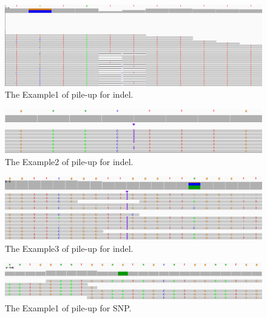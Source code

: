 \documentclass[PhD]{PHlab-thesis}
\begin{document}
\begin{figure}[h!]
	\centering
	\includegraphics[scale=0.3]{figures/INDEL1.png}
	\caption{The Example1 of pile-up for indel.}
	\label{fig:The Example of pile-up for indel1} 
\end{figure}

\begin{figure}[h!]
	\centering
	\includegraphics[scale=0.3]{figures/INDEL2.png}
	\caption{The Example2 of pile-up for indel.}
	\label{fig:The Example of pile-up for indel2} %
\end{figure}

\begin{figure}[h!]
	\centering
	\includegraphics[scale=0.3]{figures/INDEL3.png}
	\caption{The Example3 of pile-up for indel.}
	\label{fig:The Example of pile-up for indel3} %
\end{figure}

\begin{figure}[h!]
	\centering
	\includegraphics[scale=0.3]{figures/SNP3.png}
	\caption{The Example1 of pile-up for SNP.}
	\label{fig:The Example of pile-up for SNP1} %
\end{figure}
\end{document}
